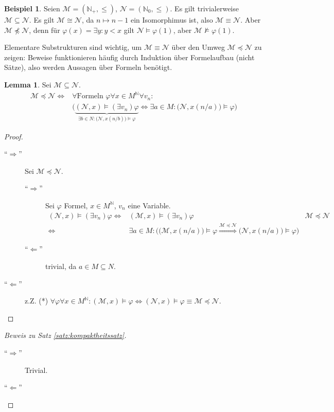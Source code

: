 \documentclass{article}
\theoremstyle{definition}
\newtheorem{lem}[dfn]{Lemma}
\newtheorem*{bsp}{Beispiel}
\theoremstyle{plain}
\newcommand{\m}[1]{\mathcal{#1}}
\begin{document}
    \begin{bsp}
        Seien $ \m{M} = (\mathbb{N}_+, \leq) $, $ \m{N} = (\mathbb{N}_0, \leq) $.
        Es gilt trivialerweise $ \m{M} \subseteq \m{N} $.
        Es gilt $ \m{M} \cong \m{N} $, da $ n \mapsto n - 1 $ ein Isomorphimus ist, also $ \m{M} \equiv \m{N}$.
        Aber $ \m{M} \not \preceq \m{N} $, denn für $ \varphi(x) = \exists y: y < x $ gilt $ \m{N} \models \varphi(1) $, aber $ \m{M} \not \models \varphi(1) $.
    \end{bsp}

    Elementare Substrukturen sind wichtig, um $ \m{M} \equiv \m{N} $ über den Umweg $ \m{M} \preceq \m{N} $ zu zeigen: Beweise funktionieren häufig durch Induktion über Formelaufbau (nicht Sätze), also werden Aussagen über Formeln benötigt.

    \begin{lem}
        Sei $ \m{M} \subseteq \m{N} $.
        \begin{align*}
            \m{M} \preceq \m{N} \Leftrightarrow & \forall \text{Formeln }\varphi \forall x \in M^\mathbb{N} \forall v_n: \\
            & \bigg( \underbrace{(\m{N}, x) \models (\exists v_n)\varphi}_{\exists b \in N: \big(\m{N}, x(n/b)\big) \models \varphi} \Leftrightarrow \exists a \in M : \big(\m{N}, x(n/a)\big) \models \varphi \bigg)
        \end{align*}
    \end{lem}

    \begin{proof}
        ~\par
        \begin{description}
            \item[``$ \Rightarrow $''] Sei $ \m{M} \preceq \m{N} $.
            \begin{description}
                \item[``$ \Rightarrow $'']
                Sei $ \varphi $ Formel, $ x \in M^\mathbb{N} $, $ v_n $ eine Variable.
                \begin{align*}
                    (\m{N}, x) \models (\exists v_n) \varphi \Leftrightarrow & (\m{M}, x) \models (\exists v_n) \varphi & \m{M} \preceq \m{N} \\
                    \Leftrightarrow & \exists a \in M: \bigg( \big(\m{M}, x(n/a)\big) \models \varphi \stackrel{\m{M} \preceq \m{N}}{\Rightarrow} \big(\m{N}, x(n/a)\big) \models \varphi \bigg)
                \end{align*}
                \item[``$ \Leftarrow $''] trivial, da $ a \in M \subseteq N $.
            \end{description}
            \item[``$ \Leftarrow $''] z.Z. (*) $ \forall \varphi \forall x \in M^\mathbb{N}: (\m{M}, x) \models \varphi \Leftrightarrow (\m{N}, x) \models \varphi \equiv \m{M} \preceq \m{N} $.
        \end{description}
    \end{proof}

    \begin{proof}[Beweis zu Satz \ref{satz:kompaktheitssatz}]
        ~\par
        \begin{description}
            \item[``$ \Rightarrow $''] Trivial.
            \item[``$ \Leftarrow $'']
        \end{description}
    \end{proof}
\end{document}
